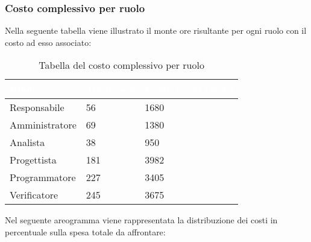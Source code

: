 \subsubsection{Costo complessivo per ruolo}
Nella seguente tabella viene illustrato il monte ore risultante per ogni ruolo con il costo ad esso associato:
{
\renewcommand{\arraystretch}{2}
\begin{longtable}{ C{3cm} C{2cm} C{4cm}}
\caption{Tabella del costo complessivo per ruolo}\\

\textcolor{white}{\textbf{Ruolo}} & 
\textcolor{white}{\textbf{Totale ore}} & 
\textcolor{white}{\textbf{Costo ruolo (in \euro{})}}\\	
\endhead
        
Responsabile   &  56 & 1680 \\
Amministratore &  69 & 1380 \\
Analista       &  38 &  950 \\
Progettista    & 181 & 3982 \\
Programmatore  & 227 & 3405 \\
Verificatore   & 245 & 3675 \\
        	
\end{longtable}
}


Nel seguente areogramma viene rappresentata la distribuzione dei costi in percentuale sulla spesa totale da affrontare:
\begin{center}
\end{center}

